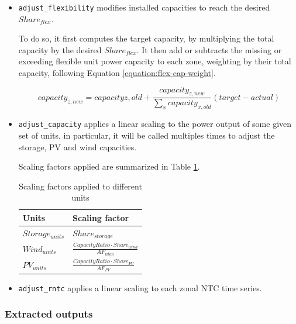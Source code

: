 \begin{itemize}
    \item \texttt{adjust\_flexibility} modifies installed capacities to reach the desired $Share_{flex}$.
    
    To do so, it first computes the target capacity, by multiplying the total capacity by the desired $Share_{flex}$. It then add or subtracts the missing or exceeding flexible unit power capacity to each zone, weighting by their total capacity, following Equation \ref{equation:flex-cap-weight}.

    \begin{equation}
        capacity_{z,new} = capacity{z,old} + \frac{capacity_{z,new}}{\sum_x capacity_{x,old}} (target-actual)
        \label{equation:flex-cap-weight}
    \end{equation}

    \item \texttt{adjust\_capacity} applies a linear scaling to the power output of some given set of units, in particular, it will be called multiples times to adjust the storage, PV and wind capacities.
    
    Scaling factors applied are summarized in Table \ref{table:scaling-factors}.

    \begin{table}[h]
        \centering
        \begin{tabular}{|l l|}
            \hline  
            Units              & Scaling factor    \\ \hline
            $Storage_{units}$  & $Share_{storage}$ \\ 
            $Wind_{units}$     & $\frac{CapacityRatio \cdot Share_{wind}}{AF_{wton}}$ \\
            $PV_{units}$       & $\frac{CapacityRatio \cdot Share_{PV}}{AF_{PV}}$ \\ \hline
        \end{tabular}
        \caption{Scaling factors applied to different units}
        \label{table:scaling-factors}
    \end{table}

    \item \texttt{adjust\_rntc} applies a linear scaling to each zonal NTC time series.
\end{itemize}

\subsubsection{Extracted outputs}

